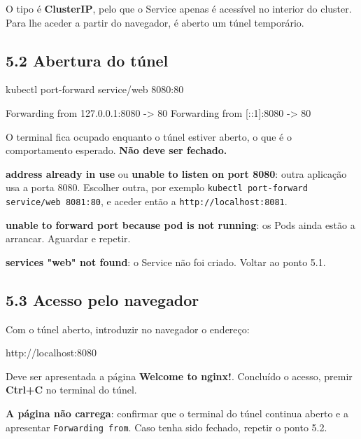 \documentclass[11pt,a4paper]{article}
\newcommand{\cmd}[1]{\texttt{#1}}
\begin{document}
O tipo é \textbf{ClusterIP}, pelo que o Service apenas é acessível no interior do cluster. Para lhe aceder a partir do navegador, é aberto um túnel temporário.

\subsection*{5.2 Abertura do túnel}

\begin{terminal}
kubectl port-forward service/web 8080:80
\end{terminal}

\begin{saida}
Forwarding from 127.0.0.1:8080 -> 80
Forwarding from [::1]:8080 -> 80
\end{saida}

O terminal fica ocupado enquanto o túnel estiver aberto, o que é o comportamento esperado. \textbf{Não deve ser fechado.}

\begin{erro}
\textbf{address already in use} ou \textbf{unable to listen on port 8080}: outra aplicação usa a porta 8080. Escolher outra, por exemplo \cmd{kubectl port-forward service/web 8081:80}, e aceder então a \cmd{http://localhost:8081}.

\textbf{unable to forward port because pod is not running}: os Pods ainda estão a arrancar. Aguardar e repetir.

\textbf{services "web" not found}: o Service não foi criado. Voltar ao ponto 5.1.
\end{erro}

\subsection*{5.3 Acesso pelo navegador}

Com o túnel aberto, introduzir no navegador o endereço:

\begin{terminal}
http://localhost:8080
\end{terminal}

Deve ser apresentada a página \textbf{Welcome to nginx!}. Concluído o acesso, premir \textbf{Ctrl+C} no terminal do túnel.

\begin{erro}
\textbf{A página não carrega}: confirmar que o terminal do túnel continua aberto e a apresentar \cmd{Forwarding from}. Caso tenha sido fechado, repetir o ponto 5.2.
\end{erro}
\end{document}
